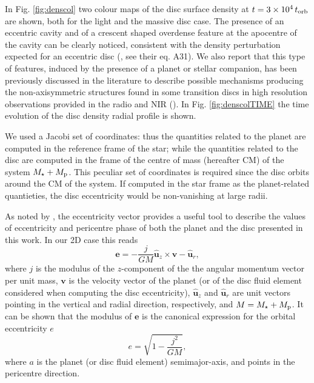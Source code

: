 \documentclass[usenatbib,a4paper,times,fleqn]{mnras}
\begin{document}
In Fig. \ref{fig:denscol} two colour maps of the disc surface density at $t=3\times10^4\,t_{\rm orb}$ are shown, both for the light and the massive disc case. The presence of an eccentric cavity and of a crescent shaped overdense feature at the apocentre of the cavity can be clearly noticed, consistent with the density perturbation expected for an eccentric disc (\citealp{teyssandier2016}, see their eq. A31). We also report that this type of features, induced by the presence of a planet or stellar companion, has been previously discussed in the literature \citep{ataiee2013,ragusa2017} to describe possible mechanisms producing the non-axisymmetric structures found in some transition discs in high resolution observations provided in the radio and NIR (\citealp{casassus2016}). In Fig. \ref{fig:denscolTIME} the time evolution of the disc density radial profile is shown. 

We used a Jacobi set of coordinates: thus the quantities related to the planet are computed in the reference frame of the star; while the quantities related to the disc are computed in the frame of the centre of mass (hereafter CM) of the system $M_\star+M_{\rm p}$. This peculiar set of coordinates is required since the disc orbits around the CM of the system. If computed in the star frame as the planet-related quantieties, the disc eccentricity would be non-vanishing at large radii.

As noted by \citet{ogilvie2001}, the eccentricity vector provides a useful tool to describe the values of eccentricity and pericentre phase of both the planet and the disc presented in this work. In our 2D case this reads
\begin{equation}
\bm e=-\frac{j}{GM} \hat{\bm u}_z\times\bm v- \hat{\bm u }_r,\label{eccvec}
\end{equation}
where $j$ is the modulus of the $z$-component of the the angular momentum vector per unit mass, $\bm v$ is the velocity vector of the planet (or of the disc fluid element considered when computing the disc eccentricity), $\hat{ \bm u}_z$ and $\hat{\bm u}_r$ are unit vectors pointing in the vertical and radial direction, respectively, and $M=M_\star+M_{\rm p}$. It can be shown that the modulus of $\bm e$ is the canonical expression for the orbital eccentricity $e$ 
\begin{equation}
e=\sqrt{1-\frac{j^2}{GM}},
\end{equation}
where $a$ is the planet (or disc fluid element) semimajor-axis, and points in the pericentre direction.
\end{document}
